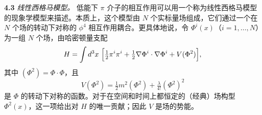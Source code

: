 \textbf{4.3} \emph{线性西格马模型。} 低能下 $\pi$ 介子的相互作用可以用一个称为线性西格马模型的现象学模型来描述。本质上，这个模型由 $N$ 个实标量场组成，它们通过一个在 $N$ 个场的转动下对称的 $\phi^4$ 相互作用耦合。更具体地说，令 $\Phi^i(x)$（$i = 1, \ldots, N$）为一组 $N$ 个场，由哈密顿量支配
\begin{equation}
  H = \int d^3x\ \Bigl[ \tfrac{1}{2}\pi^i\pi^i
    + \tfrac{1}{2}\nabla\Phi^i\cdot\nabla\Phi^i
    + V(\Phi^2) \Bigr],
\end{equation}
其中 $(\Phi^2) = \Phi\cdot\Phi$，且
\begin{equation}
  V(\Phi^2) = \tfrac{1}{2}m^2(\Phi^2) + \tfrac{\lambda}{4!}(\Phi^2)^2
\end{equation}
是 $\Phi$ 的转动下对称的函数。对于在空间和时间上都恒定的（经典）场构型 $\Phi^2(x)$，这一项给出对 $H$ 的唯一贡献；因此 $V$ 是场的势能。

